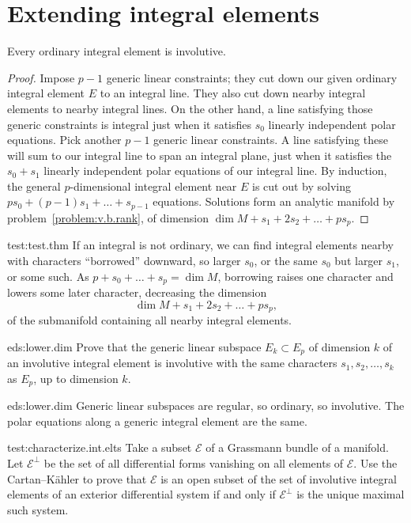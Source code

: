 \section{Extending integral elements}
\begin{lemma}\label{lemma:point.int.elements}
Every ordinary integral element is involutive.
\end{lemma}
\begin{proof}
Impose \(p-1\) generic linear constraints; they cut down our given ordinary integral element \(E\) to an integral line.
They also cut down nearby integral elements to nearby integral lines.
On the other hand, a line satisfying those generic constraints is integral just when it satisfies \(s_0\) linearly independent polar equations.
Pick another \(p-1\) generic linear constraints.
A line satisfying these will sum to our integral line to span an integral plane, just when it satisfies the \(s_0+s_1\) linearly independent polar equations of our integral line.
By induction, the general \(p\)-dimensional integral element near \(E\) is cut out by solving \(ps_0+(p-1)s_1+\dots+s_{p-1}\) equations.
Solutions form an analytic manifold by problem~\vref{problem:v.b.rank}, of dimension \(\dim M+s_1+2s_2+\dots+ps_p\).
\end{proof}
\begin{answer}{test:test.thm}
If an integral is not ordinary, we can find integral elements nearby with characters ``borrowed'' downward, so larger \(s_0\), or the same \(s_0\) but larger \(s_1\), or some such.
As \(p+s_0+\dots+s_p=\dim M\), borrowing raises one character and lowers some later character, decreasing the dimension 
\[
\dim M + s_1 + 2s_2 + \dots + ps_p,
\]
of the submanifold containing all nearby integral elements.
\end{answer}
\begin{problem}{eds:lower.dim}
Prove that the generic linear subspace \(E_k \subset E_p\) of dimension \(k\) of an involutive integral element is involutive with the same characters \(s_1,s_2,\dots,s_k\) as \(E_p\), up to dimension \(k\).
\end{problem}
\begin{answer}{eds:lower.dim}
Generic linear subspaces are regular, so ordinary, so involutive.
The polar equations along a generic integral element are the same.
\end{answer}
\begin{problem}{test:characterize.int.elts}
Take a subset \(\mathscr{E}\) of a Grassmann bundle of a manifold.
Let \(\mathscr{E}^\perp\) be the set of all differential forms vanishing on all elements of \(\mathscr{E}\).
Use the Cartan--K\"ahler to prove that \(\mathscr{E}\) is an open subset of the set of involutive integral elements of an exterior differential system if and only if \(\mathscr{E}^{\perp}\) is the unique maximal such system.
\end{problem}
